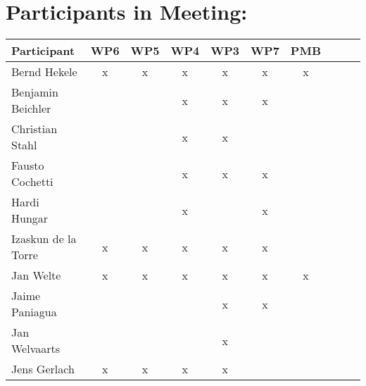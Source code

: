 \documentclass[a4paper, 11pt]{article}
\begin{document}
\section{Participants in Meeting:}

\begin{tabular}{|l|c|c|c||c|c|c||c|c|c|}
\hline
\textbf{Participant} & \textbf{WP6} &  \textbf{WP5} & \textbf{WP4}&  \textbf{WP3} & \textbf{WP7}&  \textbf{PMB} \\\hline
Bernd Hekele         & x & x & x & x & x & x \\\hline
Benjamin Beichler    &   &   & x & x & x &   \\\hline
Christian Stahl      &   &   & x & x &   &   \\\hline
Fausto Cochetti      &   &   & x & x & x &   \\\hline
Hardi Hungar         &   &   & x &   & x &   \\\hline
Izaskun de la Torre  & x & x & x & x & x &   \\\hline
Jan Welte            & x & x & x & x & x & x \\\hline
Jaime Paniagua       &   &   &   & x & x &   \\\hline
Jan Welvaarts        &   &   &   & x &   &   \\\hline
Jens Gerlach         & x & x & x & x &   &   \\\hline

\end{tabular}
\end{document}
